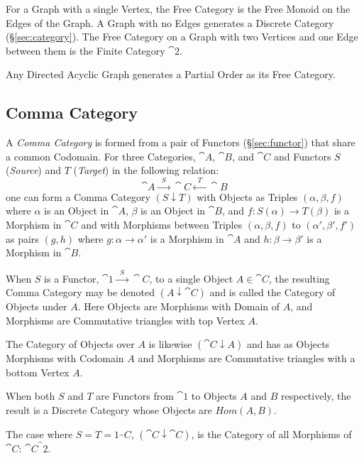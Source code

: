 For a Graph with a single Vertex, the Free Category is the Free Monoid
on the Edges of the Graph. A Graph with no Edges generates a Discrete
Category (\S\ref{sec:category}). The Free Category on a Graph with
two Vertices and one Edge between them is the Finite Category
$\cat{2}$.

Any Directed Acyclic Graph generates a Partial Order as its Free
Category.



\subsection{Comma Category}\label{sec:comma_category}

A \emph{Comma Category} is formed from a pair of Functors
(\S\ref{sec:functor}) that share a common Codomain. For three
Categories, $\cat{A}$, $\cat{B}$, and $\cat{C}$ and Functors
$S$ (\emph{Source}) and $T$ (\emph{Target}) in the following relation:
\[
  \cat{A} \xrightarrow{\;\; S\;\;} \cat{C} \xleftarrow{\;\;
    T\;\;} \cat{B}
\]
one can form a Comma Category $(S \downarrow T)$ with Objects as
Triples $(\alpha, \beta, f)$ where $\alpha$ is an Object in
$\cat{A}$, $\beta$ is an Object in $\cat{B}$, and $f : S(\alpha)
\rightarrow T(\beta)$ is a Morphism in $\cat{C}$ and with Morphisms
between Triples $(\alpha, \beta, f)$ to $(\alpha', \beta', f')$ as
pairs $(g,h)$ where $g : \alpha \rightarrow \alpha'$ is a Morphism in
$\cat{A}$ and $h : \beta \rightarrow \beta'$ is a Morphism in
$\cat{B}$.

When $S$ is a Functor, $\cat{1} \xrightarrow{\;\;S\;\;}
\cat{C}$, to a single Object $A \in \cat{C}$, the resulting
Comma Category may be denoted $(A \downarrow \cat{C})$ and is
called the Category of Objects under $A$. Here Objects are Morphisms
with Domain of $A$, and Morphisms are Commutative triangles with top
Vertex $A$.

The Category of Objects over $A$ is likewise $(\cat{C} \downarrow
A)$ and has as Objects Morphisms with Codomain $A$ and Morphisms are
Commutative triangles with a bottom Vertex $A$.

When both $S$ and $T$ are Functors from $\cat{1}$ to Objects $A$
and $B$ respectively, the result is a Discrete Category whose Objects
are $Hom(A,B)$.

The case where $S = T = 1_\cat{C}$, $(\cat{C} \downarrow
\cat{C})$, is the Category of all Morphisms of $\cat{C}$:
$\cat{C}^\cat{2}$.



